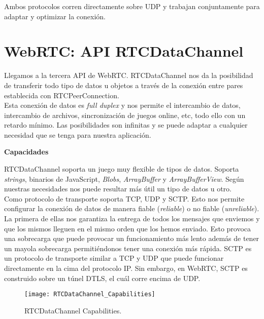Ambos protocolos corren directamente sobre UDP y trabajan conjuntamente para adaptar y optimizar la conexión.\\


\section{WebRTC: API RTCDataChannel}

Llegamos a la tercera API de WebRTC. RTCDataChannel nos da la posibilidad de transferir todo tipo de datos u objetos a través de la conexión entre pares establecida con RTCPeerConnection.\\

Esta conexión de datos es \textit{full duplex} y nos permite el intercambio de datos, intercambio de archivos, sincronización de juegos online, etc, todo ello con un retardo mínimo. Las posibilidades son infinitas y se puede adaptar a cualquier necesidad que se tenga para nuestra aplicación.\\

\begin{normalsize}
\noindent \textbf{Capacidades}\\
\end{normalsize}

RTCDataChannel soporta un juego muy flexible de tipos de datos. Soporta \textit{strings}, binarios de JavaScript, \textit{Blobs}, \textit{ArrayBuffer} y \textit{ArrayBufferView}. Según nuestras necesidades nos puede resultar más útil un tipo de datos u otro.\\

Como protocolo de transporte soporta TCP, UDP y SCTP. Esto nos permite configurar la conexión de datos de manera  fiable (\textit{reliable}) o no fiable (\textit{unreliable}). La primera de ellas nos garantiza la entrega de todos los mensajes que enviemos y que los mismos lleguen en el mismo orden que los hemos enviado. Esto provoca una sobrecarga que puede provocar un funcionamiento más lento además de tener un mayola sobrecarga permitiéndonos tener una conexión más rápida. SCTP es un protocolo de transporte similar a TCP y UDP que puede funcionar directamente en la cima del protocolo IP. Sin embargo, en WebRTC, SCTP es construido sobre un túnel DTLS, el cuál corre encima de UDP.

\begin{figure}[htb]
\centering
\texttt{[image: RTCDataChannel\_Capabilities]}
\caption{RTCDataChannel Capabilities.}
\label{fig:datachannel_capabilities}
\end{figure}

